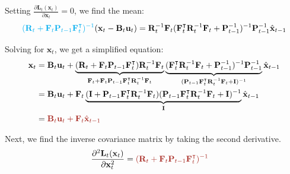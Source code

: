 \documentclass[10pt]{article}
\begin{document}
Setting $\frac{\partial \mathbf{L}_t(\mathbf{x}_t)}{\partial \mathbf{x}_t}=0$, we find the mean:
\begin{equation} 
	\begin{aligned} 
		{\color{Cyan} (\mathbf{R}_t + \mathbf{F}_t\mathbf{P}_{t-1}\mathbf{F}_t^{\intercal})^{-1}  }(\mathbf{x}_t - \mathbf{B}_t \mathbf{u}_t) =  \mathbf{R}_t^{-1}\mathbf{F}_t(\mathbf{F}_t^{\intercal}\mathbf{R}_t^{-1}\mathbf{F}_t + \mathbf{P}_{t-1}^{-1})^{-1}\mathbf{P}_{t-1}^{-1}\hat{\mathbf{x}}_{t-1}
	\end{aligned} 
\end{equation}

Solving for $\mathbf{x}_t$, we get a simplified equation:
\begin{equation}
	\begin{aligned}
		\mathbf{x}_t & = \mathbf{B}_t \mathbf{u}_t + \underbrace{ (\mathbf{R}_t + \mathbf{F}_t\mathbf{P}_{t-1}\mathbf{F}_t^{\intercal}) \mathbf{R}_t^{-1}\mathbf{F}_t }_{\mathbf{F}_t + \mathbf{F}_t\mathbf{P}_{t-1}\mathbf{F}_t^{\intercal}\mathbf{R}_t^{-1}\mathbf{F}_t} \underbrace{ (\mathbf{F}_t^{\intercal}\mathbf{R}_t^{-1}\mathbf{F}_t + \mathbf{P}_{t-1}^{-1})^{-1} \mathbf{P}_{t-1}^{-1}}_{(\mathbf{P}_{t-1}\mathbf{F}_t^{\intercal}\mathbf{R}_t^{-1}\mathbf{F}_t + \mathbf{I})^{-1}} \hat{\mathbf{x}}_{t-1} \\
		& = \mathbf{B}_t \mathbf{u}_t + \mathbf{F}_t \underbrace{ (\mathbf{I} + \mathbf{P}_{t-1}\mathbf{F}_t^{\intercal}\mathbf{R}_t^{-1}\mathbf{F}_t)(\mathbf{P}_{t-1}\mathbf{F}_t^{\intercal}\mathbf{R}_t^{-1}\mathbf{F}_t + \mathbf{I})^{-1}}_{\mathbf{I}} \hat{\mathbf{x}}_{t-1} \\
		& = {\color{Mahogany}  \mathbf{B}_t \mathbf{u}_t + \mathbf{F}_t \hat{\mathbf{x}}_{t-1} }
	\end{aligned}
\end{equation}

Next, we find the inverse covariance matrix by taking the second derivative.
\begin{equation}
	\begin{aligned}
		\frac{\partial^2 \mathbf{L}_t(\mathbf{x}_t)}{\partial \mathbf{x}^2_t} & = {\color{Mahogany}  (\mathbf{R}_t + \mathbf{F}_t\mathbf{P}_{t-1}\mathbf{F}_t^{\intercal})^{-1} }
	\end{aligned}
\end{equation}
\end{document}
